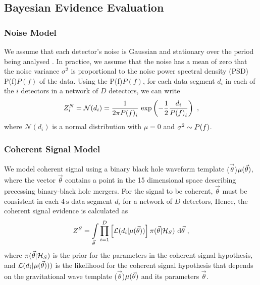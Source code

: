 \documentclass[%
 amsmath,amssymb,
 aps,
twocolumn
]{revtex4}
\newcommand{\mathcmd}[1]{{\sc \relax\ifmmode#1\else $#1$\fi}\xspace}
\newcommand{\psd}{\mathcmd{P(f)}}
\newcommand{\parameters}{\mathcmd{\vec{\theta}}}
\newcommand{\template}{\mathcmd{\mu(\parameters)}}
\begin{document}
\subsection{Bayesian Evidence Evaluation}
\subsubsection{Noise Model}
We assume that each detector's noise is Gaussian and stationary over the period being analysed \cite{ligo_psd}. In practice, we assume that the noise has a mean of zero that the noise variance $\sigma^2$ is proportional to the noise power spectral density (PSD) \psd of the data. Using the \psd, for each data segment $d_i$ in each of the $i$ detectors in a network of $D$ detectors, we can write 
\begin{equation}
\label{eq:zn}
Z^N_i = \mathcal{N}(d_i) = \frac{1}{2\pi \psd_i} \ \text{exp}\left(-\frac{1}{2} \frac{d_i}{\psd_i} \right) \ ,
\end{equation}
where $\mathcal{N}(d_i)$ is a normal distribution with $\mu=0$ and $\sigma^2\sim \psd$. 

\subsubsection{Coherent Signal Model}
We model coherent signal using a binary black hole waveform template \template, where the vector \parameters contains a point in the 15 dimensional space describing precessing binary-black hole mergers. For the signal to be coherent, \parameters must be consistent in each $4\ \text{s}$ data segment $d_i$ for a network of $D$ detectors, Hence, the coherent signal evidence is calculated as
\begin{equation}
\label{eq:zs}
Z^S = \int\limits_{\parameters} \prod\limits^{D}_{i=1} \left[ \mathcal{L}(d_i|\template)\right] \pi(\parameters | \mathcal{H}_S)\  \text{d}\parameters \ ,
\end{equation}
where $\pi(\parameters| \mathcal{H}_S)$ is the prior for the parameters in the coherent signal hypothesis, and $\mathcal{L}(d_i|\template))$ is the likelihood for the coherent signal hypothesis that depends on the gravitational wave template \template and its parameters \parameters. 
\end{document}
